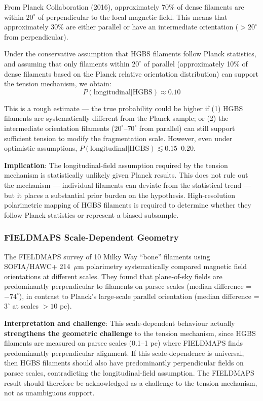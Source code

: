 \documentclass[11pt,a4paper]{article}
\begin{document}
From Planck Collaboration (2016), approximately 70\% of dense filaments are within $20^\circ$ of perpendicular to the local magnetic field. This means that approximately 30\% are either parallel or have an intermediate orientation ($>20^\circ$ from perpendicular).

Under the conservative assumption that HGBS filaments follow Planck statistics, and assuming that only filaments within $20^\circ$ of parallel (approximately 10\% of dense filaments based on the Planck relative orientation distribution) can support the tension mechanism, we obtain:
\begin{equation}
P(\text{longitudinal}|\text{HGBS}) \approx 0.10
\end{equation}

This is a rough estimate — the true probability could be higher if (1) HGBS filaments are systematically different from the Planck sample; or (2) the intermediate orientation filaments ($20^\circ$--$70^\circ$ from parallel) can still support sufficient tension to modify the fragmentation scale. However, even under optimistic assumptions, $P(\text{longitudinal}|\text{HGBS}) \lesssim 0.15$--$0.20$.

\textbf{Implication}: The longitudinal-field assumption required by the tension mechanism is statistically unlikely given Planck results. This does not rule out the mechanism — individual filaments can deviate from the statistical trend — but it places a substantial prior burden on the hypothesis. High-resolution polarimetric mapping of HGBS filaments is required to determine whether they follow Planck statistics or represent a biased subsample.

\subsubsection{FIELDMAPS Scale-Dependent Geometry}

The FIELDMAPS survey of 10 Milky Way ``bone'' filaments \citep{Coude2025} using SOFIA/HAWC+ 214~$\mu$m polarimetry systematically compared magnetic field orientations at different scales. They found that plane-of-sky fields are predominantly perpendicular to filaments on parsec scales (median difference = $-74^{\circ}$), in contrast to Planck's large-scale parallel orientation (median difference = $3^{\circ}$ at scales $>10$ pc).

\textbf{Interpretation and challenge}: This scale-dependent behaviour actually \textbf{strengthens the geometric challenge} to the tension mechanism, since HGBS filaments are measured on parsec scales (0.1--1 pc) where FIELDMAPS finds predominantly perpendicular alignment. If this scale-dependence is universal, then HGBS filaments should also have predominantly perpendicular fields on parsec scales, contradicting the longitudinal-field assumption. The FIELDMAPS result should therefore be acknowledged as a challenge to the tension mechanism, not as unambiguous support.
\end{document}
